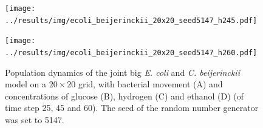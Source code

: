 \begin{figure}[h!]
{\begin{minipage}[t]{0.3\textwidth}
  \end{minipage}
  \begin{minipage}[t]{0.3\textwidth}
    \texttt{[image: ../results/img/ecoli\_beijerinckii\_20x20\_seed5147\_h245.pdf]}
  \end{minipage}
  \begin{minipage}[t]{0.3\textwidth}
    \texttt{[image: ../results/img/ecoli\_beijerinckii\_20x20\_seed5147\_h260.pdf]}
  \end{minipage}
  }
  \caption{Population dynamics of the joint big \emph{E. coli} and \emph{C. beijerinckii} model on a $20\times20$ grid, with bacterial movement (A) and concentrations of glucose (B), hydrogen (C) and ethanol (D) (of time step 25, 45 and 60). The seed of the random number generator was set to 5147.}
  \label{fig:cegrid}
\end{figure}

